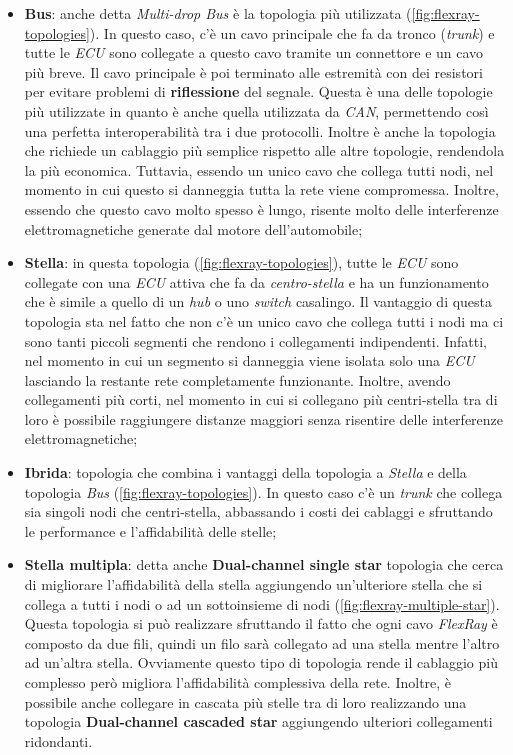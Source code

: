 \begin{itemize}
    \item \textbf{Bus}: anche detta \emph{Multi-drop Bus} è la topologia più utilizzata (\autoref{fig:flexray-topologies}). In questo caso, c'è un cavo principale che fa da tronco (\emph{trunk}) e tutte le \emph{ECU} sono collegate a questo cavo tramite un connettore e un cavo più breve. Il cavo principale è poi terminato alle estremità con dei resistori per evitare problemi di \textbf{riflessione} del segnale. Questa è una delle topologie più utilizzate in quanto è anche quella utilizzata da \emph{CAN}, permettendo così una perfetta interoperabilità tra i due protocolli. Inoltre è anche la topologia che richiede un cablaggio più semplice rispetto alle altre topologie, rendendola la più economica. Tuttavia, essendo un unico cavo che collega tutti nodi, nel momento in cui questo si danneggia tutta la rete viene compromessa. Inoltre, essendo che questo cavo molto spesso è lungo, risente molto delle interferenze elettromagnetiche generate dal motore dell'automobile;
    \item \textbf{Stella}: in questa topologia (\autoref{fig:flexray-topologies}), tutte le \emph{ECU} sono collegate con una \emph{ECU} attiva che fa da \emph{centro-stella} e ha un funzionamento che è simile a quello di un \emph{hub} o uno \emph{switch} casalingo. Il vantaggio di questa topologia sta nel fatto che non c'è un unico cavo che collega tutti i nodi ma ci sono tanti piccoli segmenti che rendono i collegamenti indipendenti. Infatti, nel momento in cui un segmento si danneggia viene isolata solo una \emph{ECU} lasciando la restante rete completamente funzionante. Inoltre, avendo collegamenti più corti, nel momento in cui si collegano più centri-stella tra di loro è possibile raggiungere distanze maggiori senza risentire delle interferenze elettromagnetiche;
    \item \textbf{Ibrida}: topologia che combina i vantaggi della topologia a \emph{Stella} e della topologia \emph{Bus} (\autoref{fig:flexray-topologies}). In questo caso c'è un \emph{trunk} che collega sia singoli nodi che centri-stella, abbassando i costi dei cablaggi e sfruttando le performance e l'affidabilità delle stelle;
    \item \textbf{Stella multipla}: detta anche \textbf{Dual-channel single star} topologia che cerca di migliorare l'affidabilità della stella aggiungendo un'ulteriore stella che si collega a tutti i nodi o ad un sottoinsieme di nodi (\autoref{fig:flexray-multiple-star}). Questa topologia si può realizzare sfruttando il fatto che ogni cavo \emph{FlexRay} è composto da due fili, quindi un filo sarà collegato ad una stella mentre l'altro ad un'altra stella. Ovviamente questo tipo di topologia rende il cablaggio più complesso però migliora l'affidabilità complessiva della rete. Inoltre, è possibile anche collegare in cascata più stelle tra di loro realizzando una topologia \textbf{Dual-channel cascaded star} aggiungendo ulteriori collegamenti ridondanti. \cite{eos_flexray} \cite{flexray_specification}
\end{itemize}

